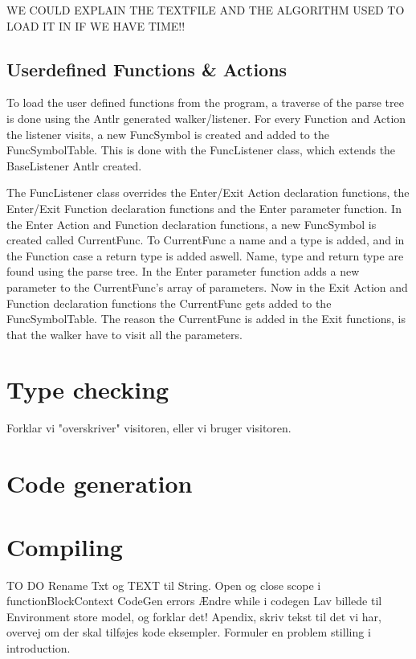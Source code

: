 WE COULD EXPLAIN THE TEXTFILE AND THE ALGORITHM USED TO LOAD IT IN IF WE HAVE TIME!!

\subsection{Userdefined Functions \& Actions}
To load the user defined functions from the program, a traverse of the parse tree is done using the Antlr generated walker/listener. For every Function and Action the listener visits, a new FuncSymbol is created and added to the FuncSymbolTable. This is done with the FuncListener class, which extends the BaseListener Antlr created.
 
The FuncListener class overrides the Enter/Exit Action declaration functions, the Enter/Exit Function declaration functions and the Enter parameter function. In the Enter Action and Function declaration functions, a new FuncSymbol is created called CurrentFunc. To CurrentFunc a name and a type is added, and in the Function case a return type is added aswell. Name, type and return type are found using the parse tree.
In the Enter parameter function adds a new parameter to the CurrentFunc's array of parameters. 
Now in the Exit Action and Function declaration functions the CurrentFunc gets added to the FuncSymbolTable. 
The reason the CurrentFunc is added in the Exit functions, is that the walker have to visit all the parameters. 

\section{Type checking}
Forklar vi "overskriver" visitoren, eller vi bruger visitoren. 


\section{Code generation}


\section{Compiling}


TO DO
Rename Txt og TEXT til String.
Open og close scope i functionBlockContext
CodeGen errors
Ændre while i codegen
Lav billede til Environment store model, og forklar det!
Apendix, skriv tekst til det vi har, overvej om der skal tilføjes kode eksempler.
Formuler en problem stilling i introduction.


